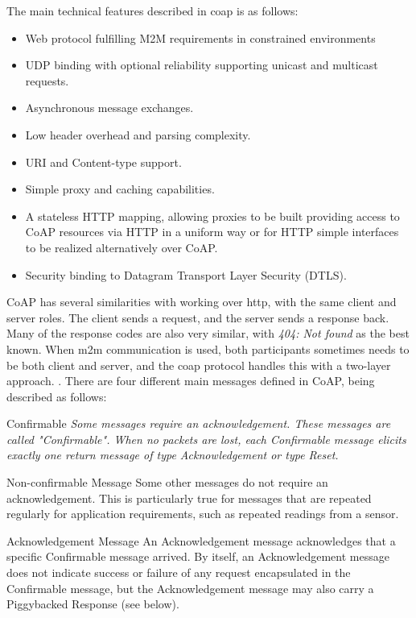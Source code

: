 The main technical features described in \gls{coap} is as follows: 

\begin{itemize}
	\item Web protocol fulfilling M2M requirements in constrained
      environments
	\item UDP binding with optional reliability supporting unicast
      and multicast requests.
	\item Asynchronous message exchanges.
	\item Low header overhead and parsing complexity.
	\item URI and Content-type support.
	\item Simple proxy and caching capabilities.
	\item A stateless HTTP mapping, allowing proxies to be built providing
      access to CoAP resources via HTTP in a uniform way or for HTTP
      simple interfaces to be realized alternatively over CoAP.
	\item Security binding to Datagram Transport Layer Security (DTLS).	
\end{itemize}


CoAP has several similarities with working over \gls{http}, with the same client and server roles. The client sends a request, and the server sends a response back. Many of the response codes are also very similar, with \textit{404: Not found} as the best known. When \gls{m2m} communication is used, both participants sometimes needs to be both client and server, and the \gls {coap} protocol handles this with a two-layer approach. . There are four different main messages defined in CoAP, being described as follows: 

   Confirmable
	  \textit{Some messages require an acknowledgement.  These messages are
      called "Confirmable".  When no packets are lost, each Confirmable
      message elicits exactly one return message of type Acknowledgement
      or type Reset.}

   Non-confirmable Message
      Some other messages do not require an acknowledgement.  This is
      particularly true for messages that are repeated regularly for
      application requirements, such as repeated readings from a sensor.

   Acknowledgement Message
      An Acknowledgement message acknowledges that a specific
      Confirmable message arrived.  By itself, an Acknowledgement
      message does not indicate success or failure of any request
      encapsulated in the Confirmable message, but the Acknowledgement
      message may also carry a Piggybacked Response (see below).
      


